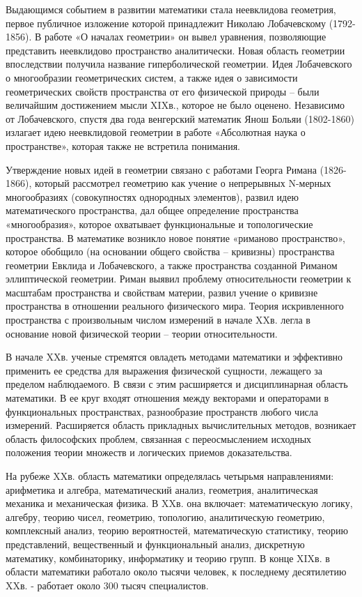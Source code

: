 \documentclass[exam_answers.tex]{subfiles}
\begin{document}
Выдающимся событием в развитии математики стала неевклидова
геометрия, первое публичное изложение которой принадлежит Николаю
Лобачевскому (1792-1856).
В работе «О началах геометрии» он вывел
уравнения, позволяющие представить неевклидово пространство аналитически.
Новая область геометрии впоследствии получила название гиперболической
геометрии. Идея Лобачевского о многообразии геометрических систем, а также
идея о зависимости геометрических свойств пространства от его физической
природы – были величайшим достижением мысли XIXв., которое не было
оценено. Независимо от Лобачевского, спустя два года венгерский математик
Янош Больяи (1802-1860) излагает идею неевклидовой геометрии в работе
«Абсолютная наука о пространстве», которая также не встретила понимания.

Утверждение новых идей в геометрии связано с работами Георга Римана
(1826-1866), который рассмотрел геометрию как учение о непрерывных
N-мерных многообразиях (совокупностях однородных элементов), развил идею
математического пространства, дал общее определение пространства
«многообразия», которое охватывает функциональные и топологические
пространства. В математике возникло новое понятие «риманово пространство»,
которое обобщило (на основании общего свойства – кривизны) пространства
геометрии Евклида и Лобачевского, а также пространства созданной Риманом
эллиптической геометрии. Риман выявил проблему относительности геометрии
к масштабам пространства и свойствам материи, развил учение о кривизне
пространства в отношении реального физического мира. Теория искривленного
пространства с произвольным числом измерений в начале XXв. легла в
основание новой физической теории – теории относительности.

В начале XXв. ученые стремятся овладеть методами математики и
эффективно применить ее средства для выражения физической сущности,
лежащего за пределом наблюдаемого. В связи с этим расширяется и
дисциплинарная область математики. В ее круг входят отношения между
векторами и операторами в функциональных пространствах, разнообразие
пространств любого числа измерений. Расширяется область прикладных
вычислительных методов, возникает область философских проблем, связанная
с переосмыслением исходных положения теории множеств и логических
приемов доказательства.

На рубеже XXв. область математики определялась четырьмя
направлениями: арифметика и алгебра, математический анализ, геометрия,
аналитическая механика и механическая физика. В XXв. она включает:
математическую логику, алгебру, теорию чисел, геометрию, топологию,
аналитическую геометрию, комплексный анализ, теорию вероятностей,
математическую статистику, теорию представлений, вещественный и
функциональный анализ, дискретную математику, комбинаторику,
информатику и теорию групп. В конце XIXв. в области математики работало
около тысячи человек, к последнему десятилетию XXв. - работает около 300
тысяч специалистов.
\end{document}

